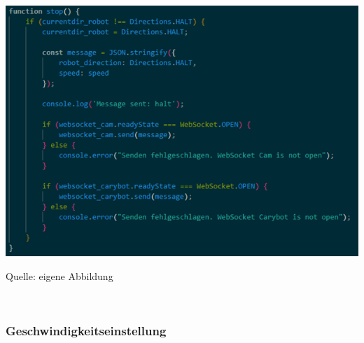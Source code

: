 \documentclass[ngerman,12pt,a4paper]{article}
\begin{document}
	\begin{center}
		\begin{minipage}[t]{0.75\textwidth}
			\includegraphics[scale=0.7]{Pictures/Steuerung-js4}
			\label{fig:Steuerkreuz-js4}
			\vspace{-10pt}
			\begin{center}
				\par\small Quelle: eigene Abbildung 
			\end{center}
		\end{minipage} \\[0.75cm]
	\end{center}
				
				\subsubsection*{Geschwindigkeitseinstellung}
			
\end{document}
